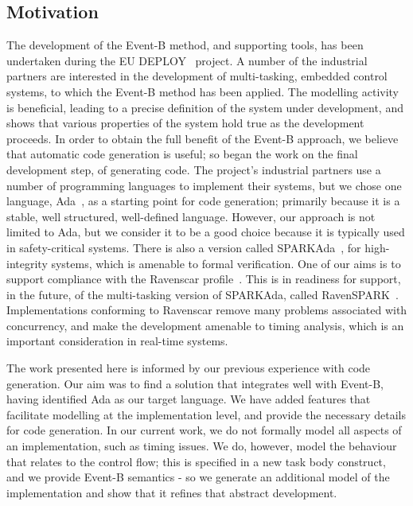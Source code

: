 \subsection{Motivation}\label{motive}
The development of the Event-B method, and supporting tools, has been undertaken during the EU DEPLOY~\cite{DEPLOY} project. A number of the industrial partners are interested in the development of multi-tasking, embedded control systems, to which the Event-B method has been applied. The modelling activity is beneficial, leading to a precise definition of the system under development, and shows that various properties of the system hold true as the development proceeds. In order to obtain the full benefit of the Event-B approach, we believe that automatic code generation is useful; so began the work on the final development step, of generating code. The project's industrial partners use a number of programming languages to implement their systems, but we chose one language, Ada~\cite{ada2005}, as a starting point for code generation; primarily because it is a stable, well structured, well-defined language. However, our approach is not limited to Ada, but we consider it to be a good choice because it is typically used in safety-critical systems.  There is also a version called SPARKAda~\cite{SPARKAda}, for high-integrity systems, which is amenable to formal verification. One of our aims is to support compliance with the Ravenscar profile~\cite{Burns1999}. This is in readiness for support, in the future, of the multi-tasking version of SPARKAda, called RavenSPARK~\cite{ravenspark}. Implementations conforming to Ravenscar remove many problems associated with concurrency, and make the development amenable to timing analysis, which is an important consideration in real-time systems.

The work presented here is informed by our previous experience with code generation. Our aim was to find a solution that integrates well with Event-B, having identified Ada as our target language. We have added features that facilitate modelling at the implementation level, and provide the necessary details for code generation. In our current work, we do not formally model all aspects of an implementation, such as timing issues. We do, however, model the behaviour that relates to the control flow; this is specified in a new task body construct, and we provide Event-B semantics - so we generate an additional model of the implementation and show that it refines that abstract development. 

